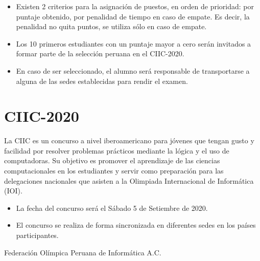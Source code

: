 \documentclass{article}
\begin{document}
\begin{itemize}
 \item 
Existen 2 criterios para la asignación de puestos, en orden de prioridad: por puntaje obtenido, por penalidad de tiempo en caso de empate.
Es decir, la penalidad no quita puntos, se utiliza sólo en caso de empate.

 \item 
Los 10 primeros estudiantes con un puntaje mayor a cero serán invitados a formar parte de la selección peruana en el CIIC-2020.

 \item 
En caso de ser seleccionado, el alumno será responsable de transportarse a alguna de las sedes establecidas para rendir el examen.
 
\end{itemize}

\section{CIIC-2020}

La CIIC es un concurso a nivel iberoamericano para jóvenes que tengan gusto y facilidad por resolver problemas prácticos mediante la lógica y el uso de computadoras. Su objetivo es promover el aprendizaje de las ciencias computacionales en los estudiantes y servir como preparación para las delegaciones nacionales que asisten a la Olimpiada Internacional de Informática (IOI).

\begin{itemize}
\item 
La fecha del concurso será el {\color{red} Sábado 5 de Setiembre de 2020}.

\item 

El concurso se realiza de forma sincronizada en diferentes sedes en los países participantes.



\end{itemize}
\vspace*{1.5cm}

\hspace*{\fill}
Federación Olímpica Peruana de Informática A.C.

%
%
\end{document}
